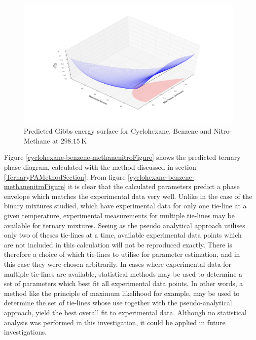 \begin{figure}[h]
\vspace{40pt}
\centering
\includegraphics[width = \textwidth, bb=100 100 1600 700]{Results_Parts/TernaryParams/cyclohexane-benzene-methanenitro/DWPM/rotation1.png}
\caption{Predicted Gibbs energy surface for Cyclohexane, Benzene and Nitro-Methane at $298.15~\mathrm{K}$}
\label{cyclohexane-benzene-methanenitroGibbsEnergySurface}
\end{figure}	

Figure \ref{cyclohexane-benzene-methanenitroFigure} shows the predicted ternary phase diagram, calculated with the method discussed in section \ref{TernaryPAMethodSection}. From figure \ref{cyclohexane-benzene-methanenitroFigure} it is clear that the calculated parameters predict a phase envelope which matches the experimental data very well. Unlike in the case of the binary mixtures studied, which have experimental data for only one tie-line at a given temperature, experimental measurements for multiple tie-lines may be available for ternary mixtures. Seeing as the pseudo analytical approach utilises only two of theses tie-lines at a time, available experimental data points which are not included in this calculation will not be reproduced exactly. There is therefore a choice of which tie-lines to utilise for parameter estimation, and in this case they were chosen arbitrarily. In cases where experimental data for multiple tie-lines are available, statistical methods may be used to determine a set of parameters which best fit all experimental data points. In other words, a method like the principle of maximum likelihood for example, may be used to determine the set of tie-lines whose use together with the pseudo-analytical approach, yield the best overall fit to experimental data. Although no statistical analysis was performed in this investigation, it could be applied in future investigations.\\

